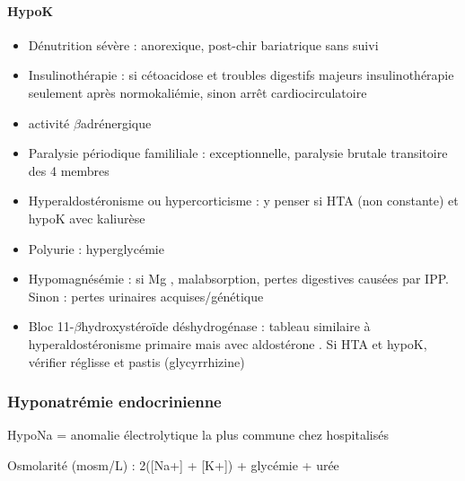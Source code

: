 \documentclass[11pt]{article}
\begin{document}
\paragraph{HypoK}
\label{sec:orgf25196e}
\begin{itemize}
\item Dénutrition sévère : anorexique, post-chir bariatrique sans suivi
\item Insulinothérapie : si cétoacidose et troubles digestifs majeurs \thus
insulinothérapie seulement après normokaliémie, sinon arrêt cardiocirculatoire
\item \inc activité \(\beta\)adrénergique
\item Paralysie périodique famililiale : exceptionnelle, paralysie brutale
transitoire des 4 membres
\item Hyperaldostéronisme ou hypercorticisme : y penser si HTA (non constante) et hypoK avec
kaliurèse \inc
\item Polyurie : hyperglycémie \inc
\item Hypomagnésémie : si Mg \dec, malabsorption, pertes digestives causées par
IPP. Sinon : pertes urinaires acquises/génétique
\item Bloc 11-\(\beta\)hydroxystéroïde déshydrogénase : tableau similaire à
hyperaldostéronisme primaire mais avec aldostérone \dec. Si HTA et hypoK,
vérifier réglisse et pastis (glycyrrhizine)
\end{itemize}

\subsubsection{Hyponatrémie endocrinienne}
\label{sec:orgd3b9c58}

HypoNa = anomalie électrolytique la plus commune chez hospitalisés

Osmolarité (mosm/L) : 2\texttimes{}([Na+] + [K+]) + glycémie + urée
\end{document}
